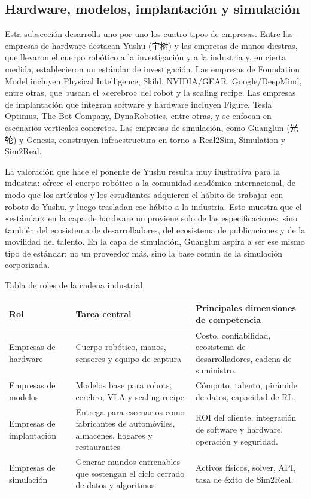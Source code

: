 \subsection{Hardware, modelos, implantación y simulación}

Esta subsección desarrolla uno por uno los cuatro tipos de empresas. Entre las empresas de hardware destacan Yushu (宇树) y las empresas de manos diestras, que llevaron el cuerpo robótico a la investigación y a la industria y, en cierta medida, establecieron un estándar de investigación. Las empresas de Foundation Model incluyen Physical Intelligence, Skild, NVIDIA/GEAR, Google/DeepMind, entre otras, que buscan el «cerebro» del robot y la scaling recipe. Las empresas de implantación que integran software y hardware incluyen Figure, Tesla Optimus, The Bot Company, DynaRobotics, entre otras, y se enfocan en escenarios verticales concretos. Las empresas de simulación, como Guanglun (光轮) y Genesis, construyen infraestructura en torno a Real2Sim, Simulation y Sim2Real.

La valoración que hace el ponente de Yushu resulta muy ilustrativa para la industria: ofrece el cuerpo robótico a la comunidad académica internacional, de modo que los artículos y los estudiantes adquieren el hábito de trabajar con robots de Yushu, y luego trasladan ese hábito a la industria. Esto muestra que el «estándar» en la capa de hardware no proviene solo de las especificaciones, sino también del ecosistema de desarrolladores, del ecosistema de publicaciones y de la movilidad del talento. En la capa de simulación, Guanglun aspira a ser ese mismo tipo de estándar: no un proveedor más, sino la base común de la simulación corporizada.

\begin{knowledgebox}{Tabla de roles de la cadena industrial}
\begin{tabularx}{\textwidth}{p{}p{}X}
\toprule
Rol & Tarea central & Principales dimensiones de competencia \\
\midrule
Empresas de hardware & Cuerpo robótico, manos, sensores y equipo de captura & Costo, confiabilidad, ecosistema de desarrolladores, cadena de suministro. \\
Empresas de modelos & Modelos base para robots, cerebro, VLA y scaling recipe & Cómputo, talento, pirámide de datos, capacidad de RL. \\
Empresas de implantación & Entrega para escenarios como fabricantes de automóviles, almacenes, hogares y restaurantes & ROI del cliente, integración de software y hardware, operación y seguridad. \\
Empresas de simulación & Generar mundos entrenables que sostengan el ciclo cerrado de datos y algoritmos & Activos físicos, solver, API, tasa de éxito de Sim2Real. \\
\bottomrule
\end{tabularx}
\end{knowledgebox}

